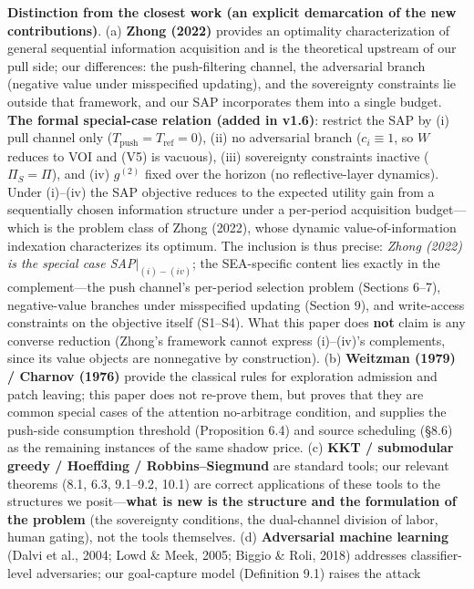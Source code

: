 \documentclass[
  11pt]{article}
\begin{document}
\textbf{Distinction from the closest work (an explicit demarcation of
the new contributions)}. (a) \textbf{Zhong (2022)} provides an
optimality characterization of general sequential information
acquisition and is the theoretical upstream of our pull side; our
differences: the push-filtering channel, the adversarial branch
(negative value under misspecified updating), and the sovereignty
constraints lie outside that framework, and our SAP incorporates them
into a single budget. \textbf{The formal special-case relation (added in
v1.6)}: restrict the SAP by (i) pull channel only
(\(T_{\mathrm{push}} = T_{\mathrm{ref}} = 0\)), (ii) no adversarial
branch (\(c_i \equiv 1\), so \(W\) reduces to VOI and (V5) is vacuous),
(iii) sovereignty constraints inactive (\(\Pi_S = \Pi\)), and (iv)
\(g^{(2)}\) fixed over the horizon (no reflective-layer dynamics). Under
(i)--(iv) the SAP objective reduces to the expected utility gain from a
sequentially chosen information structure under a per-period acquisition
budget---which is the problem class of Zhong (2022), whose dynamic
value-of-information indexation characterizes its optimum. The inclusion
is thus precise: \emph{Zhong (2022) is the special case
SAP\(|_{(i)-(iv)}\)}; the SEA-specific content lies exactly in the
complement---the push channel's per-period selection problem (Sections
6--7), negative-value branches under misspecified updating (Section 9),
and write-access constraints on the objective itself (S1--S4). What this
paper does \textbf{not} claim is any converse reduction (Zhong's
framework cannot express (i)--(iv)'s complements, since its value
objects are nonnegative by construction). (b) \textbf{Weitzman (1979) /
Charnov (1976)} provide the classical rules for exploration admission
and patch leaving; this paper does not re-prove them, but proves that
they are common special cases of the attention no-arbitrage condition,
and supplies the push-side consumption threshold (Proposition 6.4) and
source scheduling (§8.6) as the remaining instances of the same shadow
price. (c) \textbf{KKT / submodular greedy / Hoeffding /
Robbins--Siegmund} are standard tools; our relevant theorems (8.1, 6.3,
9.1--9.2, 10.1) are correct applications of these tools to the
structures we posit---\textbf{what is new is the structure and the
formulation of the problem} (the sovereignty conditions, the
dual-channel division of labor, human gating), not the tools themselves.
(d) \textbf{Adversarial machine learning} (Dalvi et al., 2004; Lowd \&
Meek, 2005; Biggio \& Roli, 2018) addresses classifier-level
adversaries; our goal-capture model (Definition 9.1) raises the attack
\end{document}
